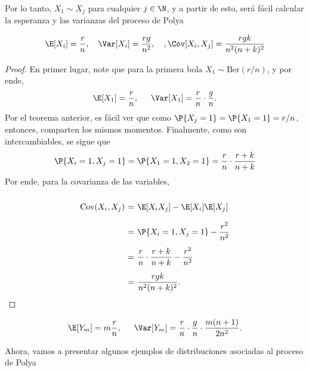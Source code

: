 Por lo tanto, $X_1\sim X_j$ para cualquier $j\in\N$, y a partir de esto, será fácil calcular la esperanza y las varianzas del proceso de Polya

\begin{theorem}
    \[ \E[X_i] = \frac{r}{n},\hspace*{1em} \Var[X_i] = \frac{rg}{n^2},\hspace*{1em}, \Cov[X_i,X_j] = \frac{rgk}{n^2 (n+k)^2}  \]
\end{theorem}
\begin{proof}
    En primer lugar, note que para la primera bola $X_1 \sim \text{Ber}(r/n)$, y por ende,
    \[ \E[X_1] = \frac{r}{n},\hspace*{1.5em} \Var[X_1] = \frac{r}{n}\cdot\frac{g}{n}. \]
    Por el teorema anterior, es fácil ver que como $\P\{X_j = 1\} = \P\{X_1 = 1\} = r/n$, entonces, comparten los mismos momentos. Finalmente, como son intercambiables, se sigue que
    \[ \P\{X_i = 1, X_j = 1\} = \P\{X_1 = 1, X_2 = 1\} = \frac{r}{n}\cdot \frac{r+k}{n+k} \]
    Por ende, para la covarianza de las variables,
    \[ \everymath{\displaystyle}
    \arraycolsep=1.8pt\def\arraystretch{2.5}
    \begin{array}{rcl}
        \text{Cov}(X_i,X_j) & = & \E[X_i X_j] - \E[X_i]\E[X_j]\\
        & = & \P\{X_i = 1, X_j = 1\} - \frac{r^2}{n^2}\\
        & = & \frac{r}{n}\cdot \frac{r+k}{n+k} - \frac{r^2}{n^2}\\
        & = & \frac{rgk}{n^2 (n+k)^2}.
    \end{array} \]

\end{proof}

\begin{corollary}
    \[ \E[Y_m] = m\frac{r}{n},\hspace*{1.5em} \Var[Y_m] = \frac{r}{n} \cdot \frac{g}{n} \cdot \frac{m(n+1)}{2n^2}. \]
\end{corollary}

Ahora, vamos a presentar algunos ejemplos de distribuciones asociadas al proceso de Polya

\begin{theorem}
    
\end{theorem}